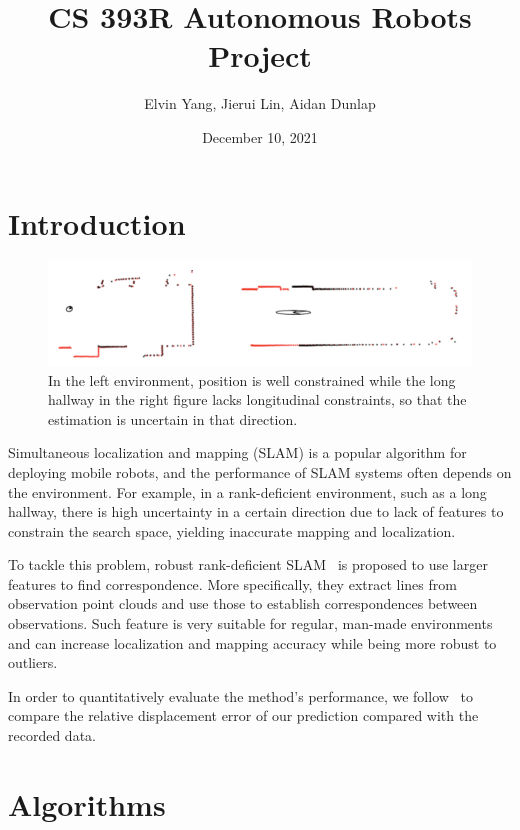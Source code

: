 \documentclass[11pt]{article}
\title{CS 393R Autonomous Robots \\ \large Project}
\author{Elvin Yang, Jierui Lin, Aidan Dunlap}
\date{December 10, 2021}
\begin{document}
\maketitle

\section{Introduction}

\begin{figure}[t]
\begin{center}
\includegraphics[width=\linewidth]{hallway.png}
\end{center}
\caption{In the left environment, position is well constrained while the long hallway in the right figure lacks longitudinal constraints, so that the estimation is uncertain in that direction.
}
\label{fig:teaser}
\end{figure}
Simultaneous localization and mapping (SLAM) is a popular algorithm for deploying mobile robots, and the
performance of SLAM systems often depends on the environment.
For example, in a rank-deficient environment, such as a long hallway, there is high uncertainty in a certain direction due to lack of features to constrain the search space, yielding inaccurate mapping and localization. 

To tackle this problem, robust rank-deficient SLAM~\cite{Nashed2021RobustRD} is proposed to use larger features to find correspondence. More specifically, they extract lines from observation point clouds and use those to establish correspondences between observations. Such feature is very suitable for regular, man-made environments and can increase localization and mapping accuracy while being more robust to outliers.

In order to quantitatively evaluate the method's performance, we follow~\cite{Kmmerle2009OnMT} to compare the relative displacement error of our prediction compared with the recorded data.




\section{Algorithms}
\end{document}
